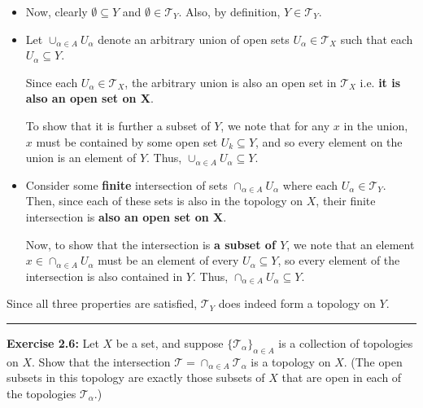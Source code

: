 \documentclass{article}
\begin{document}
\begin{itemize}
  \item Now, clearly $\emptyset \subseteq Y$ and $\emptyset \in \mathcal T_{Y}$. Also, by definition, $Y \in \mathcal T_Y$.
  \vskip 0.25cm

  \item Let $\cup_{\alpha \in A} U_{\alpha}$ denote an arbitrary union of open sets $U_{\alpha} \in \mathcal T_X$ such that each $U_{\alpha} \subseteq Y$.
  
  Since each $U_{\alpha} \in \mathcal T_X$, the arbitrary union is also an open set in $\mathcal T_X$ i.e. \textbf{it is also an open set on X}. 
  
  To show that it is further a subset of $Y$, we note that for any $x$ in the union, $x$ must be contained by some open set $U_k \subseteq Y$, and so every element on the union is an element of $Y$. Thus, $\cup_{\alpha \in A} U_{\alpha} \subseteq Y$.
  \vskip 0.25cm

  \item Consider some \textbf{finite} intersection of sets $\cap_{\alpha \in A} U_{\alpha}$ where each $U_{\alpha} \in \mathcal T_Y$. Then, since each of these sets is also in the topology on $X$, their finite intersection is \textbf{also an open set on X}.
  
  Now, to show that the intersection is \textbf{a subset of $Y$}, we note that an element $x \in \cap_{\alpha \in A} U_{\alpha}$ must be an element of every $U_{\alpha} \subseteq Y$, so every element of the intersection is also contained in $Y$. Thus, $\cap_{\alpha \in A} U_{\alpha} \subseteq Y$.
\end{itemize}

Since all three properties are satisfied, $\mathcal T_Y$ does indeed form a topology on $Y$.
\vskip 0.5cm
\hrule
\vskip 0.5cm

\textbf{Exercise 2.6:} Let $X$ be a set, and suppose $\{\mathcal T_\alpha\}_{\alpha \in A}$ is a collection of topologies on
$X$. Show that the intersection $\mathcal T = \cap_{\alpha \in A} \mathcal T_{\alpha}$ is a topology on $X$. (The open subsets in this topology are exactly those subsets of $X$ that are open in each of the topologies $\mathcal T_{\alpha}$.)

\vskip 0.5cm
\end{document}
